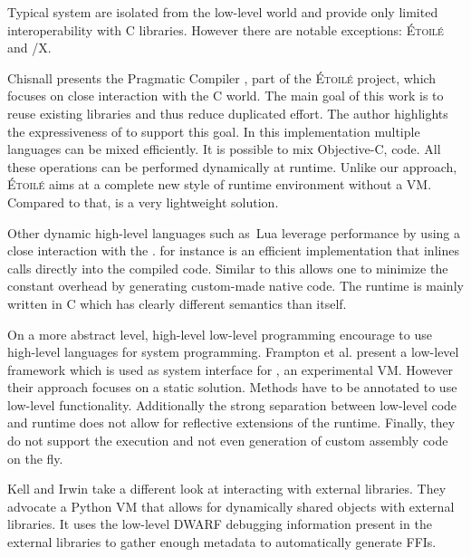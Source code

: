 
Typical \ST system are isolated from the low-level world and provide only limited interoperability with C libraries.
However there are notable exceptions: \textsc{Étoilé} and \ST/X.

Chisnall presents the Pragmatic \ST Compiler \cite{Chis12a}, part of the \textsc{Étoilé} project, which focuses on close interaction with the C world.
The main goal of this work is to reuse existing libraries and thus reduce duplicated effort.
The author highlights the expressiveness of \ST to support this goal.
In this \ST implementation multiple languages can be mixed efficiently.
It is possible to mix Objective-C, \ST code.
All these operations can be performed dynamically at runtime.
Unlike our approach, \textsc{Étoilé} aims at a complete new style of runtime environment without a VM.
Compared to that, \NB is a very lightweight solution.


Other dynamic high-level languages such as\ Lua leverage \FFI performance by using a close interaction with the \JIT.
\LuaJIT \cite{luaffi} for instance is an efficient \Lua implementation that inlines \FFI calls directly into the \JIT compiled code.
Similar to \NB this allows one to minimize the constant overhead by generating custom-made native code.
The \LuaJIT runtime is mainly written in C which has clearly different semantics than \Lua itself.


On a more abstract level, high-level low-level programming \cite{Fram09a} encourage to use high-level languages for system programming.
Frampton et al. present a low-level framework  which is used as system interface for \Jikes, an experimental \Java VM.
However their approach focuses on a static solution.
Methods have to be annotated to use low-level functionality.
Additionally the strong separation between low-level code and runtime does not allow for reflective extensions of the runtime.
Finally, they do not support the execution and not even generation of custom assembly code on the fly.


Kell and Irwin \cite{Kell11a} take a different look at interacting with external libraries.
They advocate a Python VM that allows for dynamically shared objects with external libraries.
It uses the low-level DWARF debugging information present in the external libraries to gather enough metadata to automatically generate FFIs.

